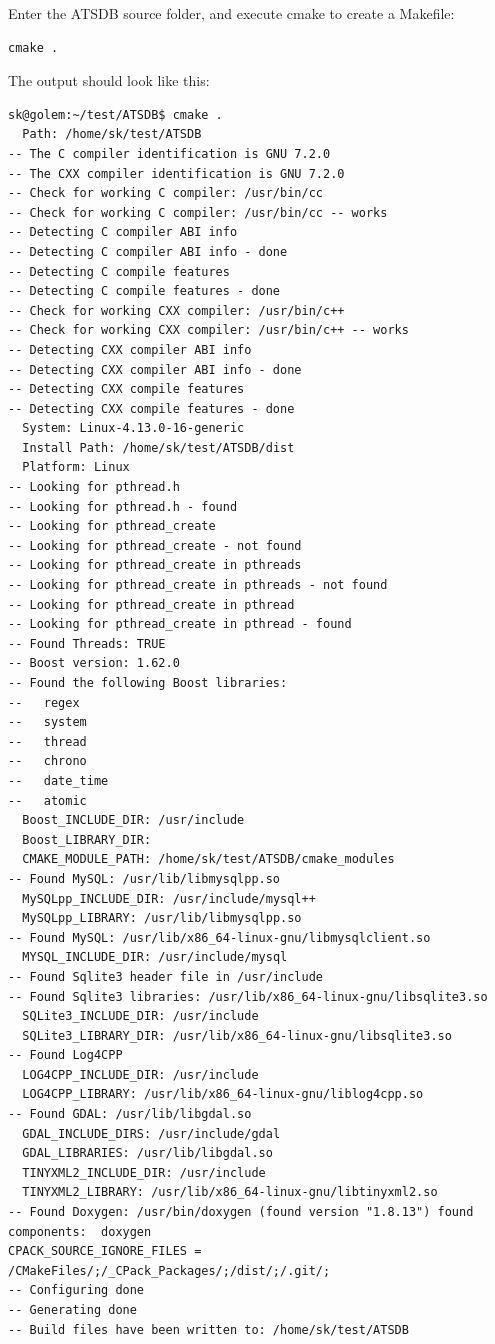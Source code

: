 \documentclass[10pt,letterpaper,extrafontsizes]{memoir}
\begin{document}
Enter the ATSDB source folder, and execute cmake to create a Makefile:

\begin{verbatim}
cmake .
\end{verbatim}

The output should look like this:
\begin{verbatim}
sk@golem:~/test/ATSDB$ cmake .
  Path: /home/sk/test/ATSDB
-- The C compiler identification is GNU 7.2.0
-- The CXX compiler identification is GNU 7.2.0
-- Check for working C compiler: /usr/bin/cc
-- Check for working C compiler: /usr/bin/cc -- works
-- Detecting C compiler ABI info
-- Detecting C compiler ABI info - done
-- Detecting C compile features
-- Detecting C compile features - done
-- Check for working CXX compiler: /usr/bin/c++
-- Check for working CXX compiler: /usr/bin/c++ -- works
-- Detecting CXX compiler ABI info
-- Detecting CXX compiler ABI info - done
-- Detecting CXX compile features
-- Detecting CXX compile features - done
  System: Linux-4.13.0-16-generic
  Install Path: /home/sk/test/ATSDB/dist
  Platform: Linux
-- Looking for pthread.h
-- Looking for pthread.h - found
-- Looking for pthread_create
-- Looking for pthread_create - not found
-- Looking for pthread_create in pthreads
-- Looking for pthread_create in pthreads - not found
-- Looking for pthread_create in pthread
-- Looking for pthread_create in pthread - found
-- Found Threads: TRUE  
-- Boost version: 1.62.0
-- Found the following Boost libraries:
--   regex
--   system
--   thread
--   chrono
--   date_time
--   atomic
  Boost_INCLUDE_DIR: /usr/include
  Boost_LIBRARY_DIR: 
  CMAKE_MODULE_PATH: /home/sk/test/ATSDB/cmake_modules
-- Found MySQL: /usr/lib/libmysqlpp.so
  MySQLpp_INCLUDE_DIR: /usr/include/mysql++
  MySQLpp_LIBRARY: /usr/lib/libmysqlpp.so
-- Found MySQL: /usr/lib/x86_64-linux-gnu/libmysqlclient.so
  MYSQL_INCLUDE_DIR: /usr/include/mysql
-- Found Sqlite3 header file in /usr/include
-- Found Sqlite3 libraries: /usr/lib/x86_64-linux-gnu/libsqlite3.so
  SQLite3_INCLUDE_DIR: /usr/include
  SQLite3_LIBRARY_DIR: /usr/lib/x86_64-linux-gnu/libsqlite3.so
-- Found Log4CPP
  LOG4CPP_INCLUDE_DIR: /usr/include
  LOG4CPP_LIBRARY: /usr/lib/x86_64-linux-gnu/liblog4cpp.so
-- Found GDAL: /usr/lib/libgdal.so  
  GDAL_INCLUDE_DIRS: /usr/include/gdal
  GDAL_LIBRARIES: /usr/lib/libgdal.so
  TINYXML2_INCLUDE_DIR: /usr/include
  TINYXML2_LIBRARY: /usr/lib/x86_64-linux-gnu/libtinyxml2.so
-- Found Doxygen: /usr/bin/doxygen (found version "1.8.13") found components:  doxygen 
CPACK_SOURCE_IGNORE_FILES = /CMakeFiles/;/_CPack_Packages/;/dist/;/.git/;
-- Configuring done
-- Generating done
-- Build files have been written to: /home/sk/test/ATSDB
\end{verbatim}
\end{document}
